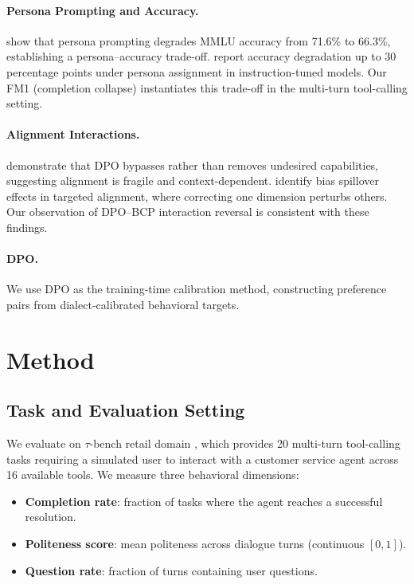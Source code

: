\documentclass[11pt,a4paper]{article}
\newcommand{\taubench}{$\tau$-bench}
\begin{document}
\paragraph{Persona Prompting and Accuracy.}
\citet{basil2025playing_pretend} show that persona prompting degrades MMLU accuracy from 71.6\% to 66.3\%, establishing a persona--accuracy trade-off.
\citet{hu2026expert_persona} report accuracy degradation up to 30 percentage points under persona assignment in instruction-tuned models.
Our FM1 (completion collapse) instantiates this trade-off in the multi-turn tool-calling setting.

\paragraph{Alignment Interactions.}
\citet{lee2024dpo_toxicity} demonstrate that DPO bypasses rather than removes undesired capabilities, suggesting alignment is fragile and context-dependent.
\citet{gupta2026intra_fairness} identify bias spillover effects in targeted alignment, where correcting one dimension perturbs others.
Our observation of DPO--BCP interaction reversal is consistent with these findings.

\paragraph{DPO.}
We use DPO \citep{rafailov2023dpo} as the training-time calibration method, constructing preference pairs from dialect-calibrated behavioral targets.

\section{Method}
\label{sec:method}

\subsection{Task and Evaluation Setting}

We evaluate on \taubench{} retail domain \citep{yao2024taubench}, which provides 20 multi-turn tool-calling tasks requiring a simulated user to interact with a customer service agent across 16 available tools.
We measure three behavioral dimensions:
\begin{itemize}
    \item \textbf{Completion rate}: fraction of tasks where the agent reaches a successful resolution.
    \item \textbf{Politeness score}: mean politeness across dialogue turns (continuous $[0,1]$).
    \item \textbf{Question rate}: fraction of turns containing user questions.
\end{itemize}
\end{document}
